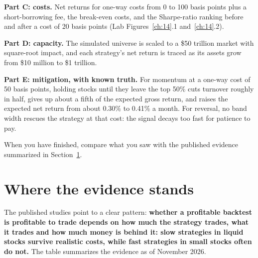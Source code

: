 \textbf{Part C: costs.} Net returns for one-way costs from 0 to 100 basis points plus a short-borrowing fee, the break-even costs, and the Sharpe-ratio ranking before and after a cost of 20 basis points (Lab Figures~\ref{ch:14}.1 and~\ref{ch:14}.2).

\textbf{Part D: capacity.} The simulated universe is scaled to a \$50 trillion market with square-root impact, and each strategy's net return is traced as its assets grow from \$10 million to \$1 trillion.

\textbf{Part E: mitigation, with known truth.} For momentum at a one-way cost of 50 basis points, holding stocks until they leave the top 50\% cuts turnover roughly in half, gives up about a fifth of the expected gross return, and raises the expected net return from about 0.30\% to 0.41\% a month. For reversal, no band width rescues the strategy at that cost: the signal decays too fast for patience to pay.

When you have finished, compare what you saw with the published evidence summarized in Section~\ref{sec:17-verdict}.

\section{Where the evidence stands}
\label{sec:17-verdict}

The published studies point to a clear pattern: \textbf{whether a profitable backtest is profitable to trade depends on how much the strategy trades, what it trades and how much money is behind it: slow strategies in liquid stocks survive realistic costs, while fast strategies in small stocks often do not.} The table summarizes the evidence as of November 2026.

